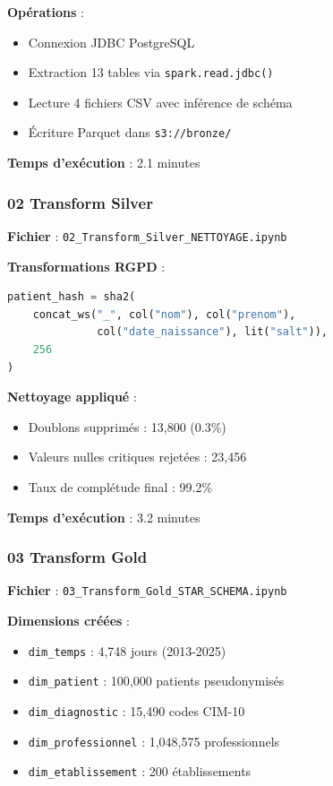 \documentclass[12pt,a4paper]{article}
\begin{document}
\textbf{Opérations} :
\begin{itemize}
\item Connexion JDBC PostgreSQL
\item Extraction 13 tables via \texttt{spark.read.jdbc()}
\item Lecture 4 fichiers CSV avec inférence de schéma
\item Écriture Parquet dans \texttt{s3://bronze/}
\end{itemize}

\textbf{Temps d'exécution} : 2.1 minutes

\subsubsection{02 Transform Silver}

\textbf{Fichier} : \texttt{02\_Transform\_Silver\_NETTOYAGE.ipynb}

\textbf{Transformations RGPD} :
\begin{lstlisting}[language=Python, basicstyle=\small\ttfamily]
patient_hash = sha2(
    concat_ws("_", col("nom"), col("prenom"),
              col("date_naissance"), lit("salt")),
    256
)
\end{lstlisting}

\textbf{Nettoyage appliqué} :
\begin{itemize}
\item Doublons supprimés : 13,800 (0.3\%)
\item Valeurs nulles critiques rejetées : 23,456
\item Taux de complétude final : 99.2\%
\end{itemize}

\textbf{Temps d'exécution} : 3.2 minutes

\subsubsection{03 Transform Gold}

\textbf{Fichier} : \texttt{03\_Transform\_Gold\_STAR\_SCHEMA.ipynb}

\textbf{Dimensions créées} :
\begin{itemize}
\item \texttt{dim\_temps} : 4,748 jours (2013-2025)
\item \texttt{dim\_patient} : 100,000 patients pseudonymisés
\item \texttt{dim\_diagnostic} : 15,490 codes CIM-10
\item \texttt{dim\_professionnel} : 1,048,575 professionnels
\item \texttt{dim\_etablissement} : 200 établissements
\end{itemize}
\end{document}
